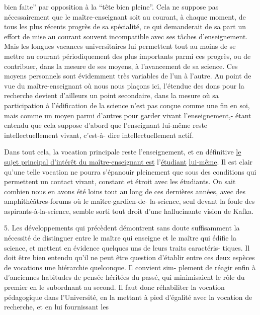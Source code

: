 
bien faite'' par opposition à la ``tête bien pleine''. Cela ne suppose pas
nécessairement que le maître-enseignant soit au courant, à chaque moment,
de tous les plus récents progrès de sa spécialité, ce qui demanderait de sa
part un effort de mise au courant souvent incompatible avec ses tâches
d'enseignement. Mais les longues vacances universitaires lui permettent
tout au moins de se mettre au courant périodiquement des plus importants
parmi ces progrès, ou de contribuer, dans la mesure de ses moyens, à
l'avancement de sa science. Ces moyens personnels sont évidemment très
variables de l'un à l'autre. Au point de vue du maître-enseignant où nous
nous plaçons ici, l'étendue des dons pour la recherche devient d'ailleurs
un point secondaire, dans la mesure où sa participation à l'édification de
la science n'est pas conçue comme une fin en soi, mais comme un moyen parmi
d'autres pour garder vivant l'enseignement,- étant entendu que cela suppose
d'abord que l'enseignant lui-même reste intellectuellement vivant, c'est-à-%
dire intellectuellement actif.

Dans tout cela, la vocation principale reste l'enseignement, et
en définitive \uline{le sujet principal d'intérêt du maître-enseignant est} l'\uline{étudiant}
\uline{lui-même}. Il est clair qu'une telle vocation ne pourra s'épanouir pleinement
que sous des conditions qui permettent un contact vivant, constant et étroit
avec les étudiants. On sait combien nous en avons été loins tout au long de
ces dernières années, avec des amphithéâtres-forums où le maître-gardien-de-%
la-science, seul devant la foule des aspirants-à-la-science, semble sorti
tout droit d'une hallucinante vision de Kafka.


5. Les développements qui précèdent démontrent sans doute suffisamment la
nécessité de distinguer entre le maître qui enseigne et le maître qui édifie
la science, et mettent en évidence quelques uns de leurs traits caractéris-%
tiques. Il doit être bien entendu qu'il ne peut être question d'établir entre
ces deux espèces de vocations une hiérarchie quelconque. Il convient sim-%
plement de réagir enfin à d'anciennes habitudes de pensée héritées du passé,
qui minimisaient le rôle du premier en le subordnant au second. Il faut
donc réhabiliter la vocation pédagogique dans l'Université, en la mettant
à pied d'égalité avec la vocation de recherche, et en lui fournissant les

